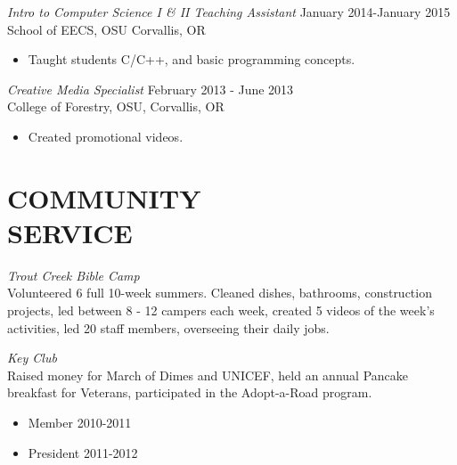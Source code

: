 \documentclass[line,margin]{res}
\begin{document}
\begin{resume}
                    {\sl Intro to Computer Science I \& II Teaching Assistant} \hfill January 2014-January 2015\\
                    School of EECS, OSU
                    Corvallis, OR
                    \begin{itemize}  \itemsep -2pt %
                        \item Taught students C/C++, and basic programming concepts.
                    \end{itemize}
                    
                    {\sl Creative Media Specialist} \hfill February 2013 - June 2013 \\
                    College of Forestry, OSU,
                    Corvallis, OR
                    \begin{itemize}
                       \item Created promotional videos.
                    \end{itemize} 
 
\section{COMMUNITY \\ SERVICE}  
                {\sl Trout Creek Bible Camp\\}
                    Volunteered 6 full 10-week summers.
                    Cleaned dishes, bathrooms, construction projects,
                    led between 8 - 12 campers each week,
                    created 5 videos of the week's activities,
                    led 20 staff members, overseeing their daily jobs.

                {\sl Key Club\\}
                    Raised money for March of Dimes and UNICEF, held an annual Pancake breakfast
                    for Veterans, participated in the Adopt-a-Road program.
                    \begin{itemize}  \itemsep -2pt %
                        \item Member 2010-2011
                        \item President 2011-2012
                    \end{itemize}


\end{resume}
\end{document}

